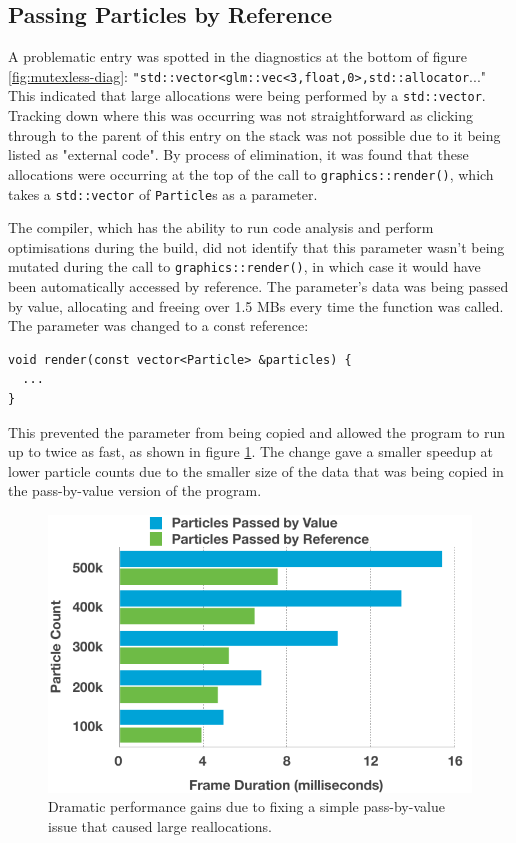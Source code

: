 \documentclass[11pt, a4paper, twocolumn]{article}
\begin{document}
\subsection{Passing Particles by Reference}

A problematic entry was spotted in the diagnostics at the bottom of figure \ref{fig:mutexless-diag}: \verb|"std::vector|\linebreak[0]\verb|<glm::vec<3,float,0>,|\linebreak[0]\verb|std::allocator|..." This indicated that large allocations were being performed by a \verb|std::vector|. Tracking down where this was occurring was not straightforward as clicking through to the parent of this entry on the stack was not possible due to it being listed as "external code". By process of elimination, it was found that these allocations were occurring at the top of the call to \verb|graphics::render()|, which takes a \verb|std::vector| of \verb|Particle|s as a parameter.

The compiler, which has the ability to run code analysis and perform optimisations during the build, did not identify that this parameter wasn't being mutated during the call to \verb|graphics::render()|, in which case it would have been automatically accessed by reference. The parameter's data was being passed by value, allocating and freeing over 1.5 MBs every time the function was called. The parameter was changed to a const reference:

\begin{verbatim}
void render(const vector<Particle> &particles) {
  ...
}
\end{verbatim}

This prevented the parameter from being copied and allowed the program to run up to twice as fast, as shown in figure \ref{fig:pass-by-value-reference}. The change gave a smaller speedup at lower particle counts due to the smaller size of the data that was being copied in the pass-by-value version of the program.

\begin{figure}[h]
\includegraphics[width=\linewidth]{pass-by-value-reference}
\caption{Dramatic performance gains due to fixing a simple pass-by-value issue that caused large reallocations.}
\label{fig:pass-by-value-reference}
\end{figure}
\end{document}
